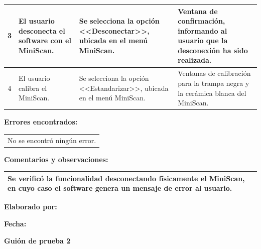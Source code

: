 {\begin{table}[h]
\begin{tabulary}{\anchotabla}{|c|J|J|J|}
			3 & El usuario desconecta el software con el MiniScan. & Se selecciona la opci\'{o}n <<Desconectar>>, ubicada en el men\'{u} MiniScan. & Ventana de confirmaci\'{o}n, informando al usuario que la desconexi\'{o}n ha sido realizada.\\ \hline
			
			4 & El usuario calibra el MiniScan. & Se selecciona la opci\'{o}n <<Estandarizar>>, ubicada en el men\'{u} MiniScan. & Ventanas de calibraci\'{o}n para la trampa negra y la cer\'{a}mica blanca del MiniScan.\\ \hline
		\end{tabulary}
\end{table}
\newpage
\textbf{Errores encontrados:}
\begin{table}[H]
	\centering
	\setlength{\extrarowheight}{\altocelda}
	\begin{tabularx}{\anchotabla}{|X|}
		\hline
		\thead{\textbf{\small{Descripci\'{o}n del error}}}
		\\ \hline
		No se encontr\'{o} ning\'{u}n error.\\ \hline
	\end{tabularx}
\end{table}

\textbf{Comentarios y observaciones:}
\begin{table}[H]
	\centering
	\setlength{\extrarowheight}{\altocelda}
	\begin{tabularx}{\anchotabla}{|X|}
		\hline
		Se verific\'{o} la funcionalidad desconectando f\'{i}sicamente el MiniScan, en cuyo caso el software genera un mensaje de error al usuario.\\ \hline
	\end{tabularx}
\end{table}

\begin{minipage}[t]{0.45\textwidth}
	\begin{flushleft}
		\textbf{Elaborado por:} \nombre
	\end{flushleft}
\end{minipage}
\begin{minipage}[t]{0.45\textwidth}
	\begin{flushright}
		\begin{center}
			\textbf{Fecha:} \fecha
		\end{center}
	\end{flushright}
\end{minipage}
\vfill
\newpage
\begin{center}
	\textbf{Gui\'{o}n de prueba 2}
\end{center}

}
